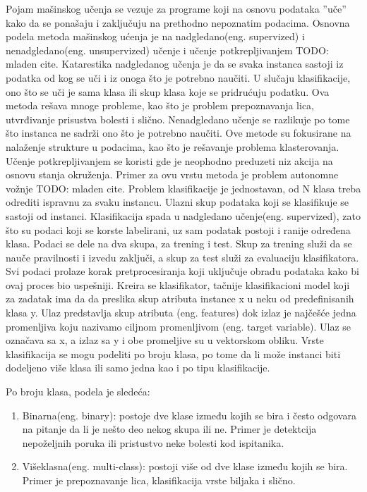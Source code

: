 \documentclass[12pt,oneside]{memoir}
\begin{document}
Pojam mašinskog učenja se vezuje za programe koji na osnovu podataka ”uče” kako da se ponašaju i zaključuju na prethodno nepoznatim podacima.  Osnovna podela metoda mašinskog ućenja je na nadgledano(eng. supervized) i nenadgledano(eng. unsupervized) učenje i učenje potkrepljivanjem TODO: mladen cite.  Katarestika nadgledanog učenja je da se svaka instanca sastoji iz podatka od kog se uči i iz onoga što je potrebno naučiti.  U slučaju klasifikacije,  ono što se uči je sama klasa ili skup klasa koje se pridrućuju podatku.  Ova metoda rešava mnoge probleme,  kao što je problem prepoznavanja lica,  utvrđivanje prisustva bolesti i slično.  Nenadgledano učenje se razlikuje po tome što instanca ne sadrži ono što je potrebno naučiti.  Ove metode su fokusirane na nalaženje strukture u podacima, kao što je rešavanje problema klasterovanja.  Učenje potkrepljivanjem se koristi gde je neophodno preduzeti niz akcija na osnovu stanja okruženja.  Primer za ovu vrstu metoda je problem autonomne vožnje TODO: mladen cite. 
Problem klasifikacije je jednostavan, od N klasa treba odrediti ispravnu za svaku instancu.  Ulazni skup podataka koji se klasifikuje se sastoji od instanci.  Klasifikacija spada u nadgledano učenje(eng. supervized),  zato što su podaci koji se korste labelirani, uz sam podatak postoji i ranije određena klasa.  Podaci se dele na dva skupa,  za trening i test.  Skup za trening služi da se nauče pravilnosti i izvedu zaključi, a skup za test služi za evaluaciju klasifikatora.  Svi podaci prolaze korak pretprocesiranja koji uključuje obradu podataka kako bi ovaj proces bio uspešniji.  Kreira se klasifikator, tačnije klasifikacioni model koji za zadatak ima da da preslika skup atributa instance x u neku od predefinisanih klasa y.   Ulaz predstavlja skup atributa (eng. features) dok izlaz je najčešće jedna promenljiva koju nazivamo ciljnom promenljivom (eng. target variable).  Ulaz se označava sa x, a izlaz sa y i obe promeljive su u vektorskom obliku. 
Vrste klasifikacija se mogu podeliti po broju klasa, po tome da li može instanci biti dodeljeno više klasa ili samo jedna kao i po tipu klasifikacije.

Po broju klasa, podela je sledeća:
\begin{enumerate}
\item Binarna(eng. binary): postoje dve klase između kojih se bira i često odgovara na pitanje da li je nešto deo nekog skupa ili ne.  Primer je detektcija nepoželjnih poruka ili pristustvo neke bolesti kod ispitanika. 
\item Višeklasna(eng. multi-class): postoji više od dve klase između kojih se bira.  Primer je prepoznavanje lica, klasifikacija vrste biljaka i slično. 
\end{enumerate}
\end{document}
